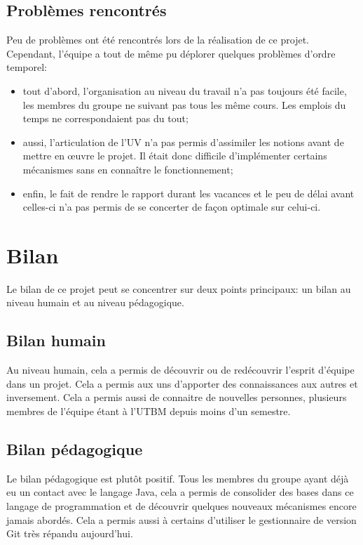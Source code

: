 \documentclass[a4paper, 11pt]{article}
\begin{document}
		\subsection{Problèmes rencontrés}
		
		Peu de problèmes ont été rencontrés lors de la réalisation de ce projet. Cependant, l'équipe a tout de même pu déplorer quelques problèmes d'ordre temporel:
		\begin{itemize}
			\item tout d'abord, l'organisation au niveau du travail n'a pas toujours été facile, les membres du groupe ne suivant pas tous les même cours. Les emplois du temps ne correspondaient pas du tout;
			\item aussi, l'articulation de l'UV n'a pas permis d'assimiler les notions avant de mettre en œuvre le projet. Il était donc difficile d'implémenter certains mécanismes sans en connaître le fonctionnement;
			\item enfin, le fait de rendre le rapport durant les vacances et le peu de délai avant celles-ci n'a pas permis de se concerter de façon optimale sur celui-ci.
		\end{itemize}
		
	\section{Bilan}
	
	Le bilan de ce projet peut se concentrer sur deux points principaux: un bilan au niveau humain et au niveau pédagogique. 
	
		\subsection{Bilan humain}
		
		Au niveau humain, cela a permis de découvrir ou de redécouvrir l'esprit d'équipe dans un projet. Cela a permis aux uns d'apporter des connaissances aux autres et inversement. Cela a permis aussi de connaitre de nouvelles personnes, plusieurs membres de l'équipe étant à l'UTBM depuis moins d'un semestre.
		
		\subsection{Bilan pédagogique}
		
		Le bilan pédagogique est plutôt positif. Tous les membres du groupe ayant déjà eu un contact avec le langage Java, cela a permis de consolider des bases dans ce langage de programmation et de découvrir quelques nouveaux mécanismes encore jamais abordés. Cela a permis aussi à certains d'utiliser le gestionnaire de version Git très répandu aujourd'hui. 
		
\end{document}
